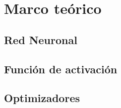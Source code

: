 \chapter{Marco teórico}
\section{Red Neuronal}
\lipsum[1-6]


\section{Función de activación}
\lipsum[1-6]
\section{Optimizadores}
\lipsum[1-6]